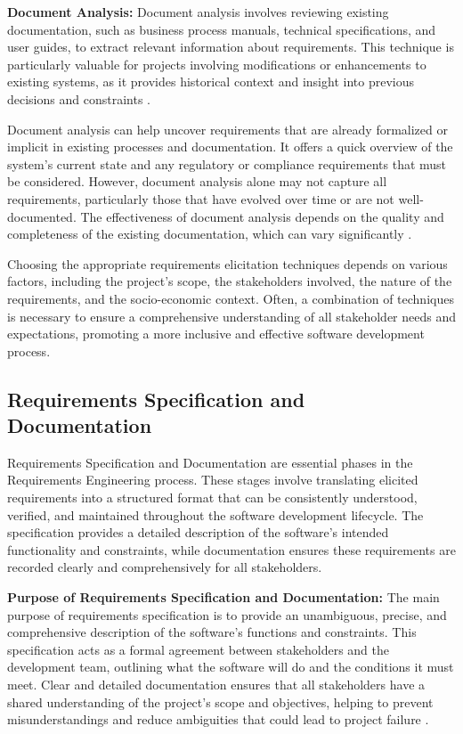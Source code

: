 \begin{refsection}
\textbf{Document Analysis:} Document analysis involves reviewing existing documentation, such as business process manuals, technical specifications, and user guides, to extract relevant information about requirements. This technique is particularly valuable for projects involving modifications or enhancements to existing systems, as it provides historical context and insight into previous decisions and constraints \cite[pp.~120-140]{wiegers2013software}.

Document analysis can help uncover requirements that are already formalized or implicit in existing processes and documentation. It offers a quick overview of the system's current state and any regulatory or compliance requirements that must be considered. However, document analysis alone may not capture all requirements, particularly those that have evolved over time or are not well-documented. The effectiveness of document analysis depends on the quality and completeness of the existing documentation, which can vary significantly \cite[pp.~42-61]{rogers2023interaction}.

Choosing the appropriate requirements elicitation techniques depends on various factors, including the project's scope, the stakeholders involved, the nature of the requirements, and the socio-economic context. Often, a combination of techniques is necessary to ensure a comprehensive understanding of all stakeholder needs and expectations, promoting a more inclusive and effective software development process.

\subsection{Requirements Specification and Documentation}

Requirements Specification and Documentation are essential phases in the Requirements Engineering process. These stages involve translating elicited requirements into a structured format that can be consistently understood, verified, and maintained throughout the software development lifecycle. The specification provides a detailed description of the software's intended functionality and constraints, while documentation ensures these requirements are recorded clearly and comprehensively for all stakeholders.

\textbf{Purpose of Requirements Specification and Documentation:} The main purpose of requirements specification is to provide an unambiguous, precise, and comprehensive description of the software's functions and constraints. This specification acts as a formal agreement between stakeholders and the development team, outlining what the software will do and the conditions it must meet. Clear and detailed documentation ensures that all stakeholders have a shared understanding of the project's scope and objectives, helping to prevent misunderstandings and reduce ambiguities that could lead to project failure \cite[pp.~35-58]{wiegers2013software}.


\end{refsection}
